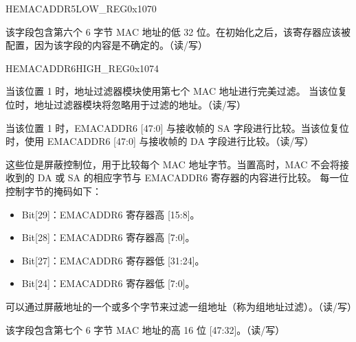 \begin{register}{H}{EMACADDR5LOW\_REG}{0x1070}\label{regdesc:EMACADDR5LOWREG}
%
\regnewline%
\begin{regdesc}\begin{reglist}
\item [EMACADDR5LOW\_REG]该字段包含第六个 6 字节 MAC 地址的低 32 位。在初始化之后，该寄存器应该被配置，因为该字段的内容是不确定的。（读/写）
\end{reglist}\end{regdesc}
\end{register}

\begin{register}{H}{EMACADDR6HIGH\_REG}{0x1074}\label{regdesc:EMACADDR6HIGHREG}
%
%
%
%
%
\regnewline%
\begin{regdesc}\begin{reglist}
\item [ADDRESS\_ENABLE6]当该位置 1 时，地址过滤器模块使用第七个 MAC 地址进行完美过滤。 当该位复位时，地址过滤器模块将忽略用于过滤的地址。（读/写）
\item [SOURCE\_ADDRESS6]当该位置 1 时，EMACADDR6 [47:0] 与接收帧的 SA 字段进行比较。当该位复位时，使用 EMACADDR6 [47:0] 与接收帧的 DA 字段进行比较。（读/写）
\item [MASK\_BYTE\_CONTROL6] 这些位是屏蔽控制位，用于比较每个 MAC 地址字节。当置高时，MAC 不会将接收到的 DA 或 SA 的相应字节与 EMACADDR6 寄存器的内容进行比较。 每一位控制字节的掩码如下：
\begin{itemize}
\item Bit[29]：EMACADDR6 寄存器高 [15:8]。\item Bit[28]：EMACADDR6 寄存器高 [7:0]。\item Bit[27]：EMACADDR6 寄存器低 [31:24]。\item Bit[24]：EMACADDR6 寄存器低 [7:0]。\end{itemize}
可以通过屏蔽地址的一个或多个字节来过滤一组地址（称为组地址过滤）。（读/写）
\item [MAC\_ADDRESS6\_HI] 该字段包含第七个 6 字节 MAC 地址的高 16 位 [47:32]。（读/写）
\end{reglist}\end{regdesc}
\end{register}

